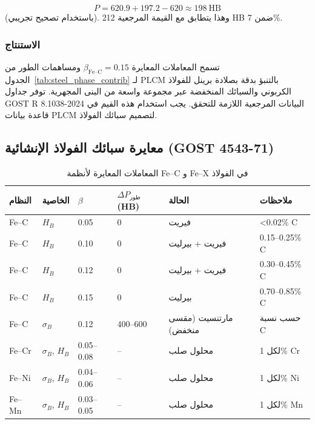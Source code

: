 \documentclass[12pt,a4paper]{article}
\begin{document}
	\[
	P = 620.9 + 197.2 - 620 \approx 198\ \text{HB}
	\]
	(باستخدام تصحيح تجريبي). وهذا يتطابق مع القيمة المرجعية 212 HB ضمن 7\%.
	
	\subsubsection{الاستنتاج}
	
	تسمح المعاملات المعايرة \(\beta_{\text{Fe–C}} = 0.15\) ومساهمات الطور من الجدول~\ref{tab:steel_phase_contrib} لـ PLCM بالتنبؤ بدقة بصلادة برينل للفولاذ الكربوني والسبائك المنخفضة عبر مجموعة واسعة من البنى المجهرية. توفر جداول GOST R 8.1038-2024 البيانات المرجعية اللازمة للتحقق. يجب استخدام هذه القيم في قاعدة بيانات PLCM لتصميم سبائك الفولاذ.
	
	\subsection{معايرة سبائك الفولاذ الإنشائية (GOST 4543-71)}
	\begin{longtable}{p{2.5cm} p{1.2cm} p{1.2cm} p{1.5cm} p{2.0cm} p{2.0cm}}
		\caption{المعاملات المعايرة لأنظمة Fe–C و Fe–X في الفولاذ}\\
		\toprule
		\textbf{النظام} & \textbf{الخاصية} & \(\beta\) & \(\Delta P_{\text{طور}}\) (HB) & \textbf{الحالة} & \textbf{ملاحظات} \\
		\midrule
		Fe–C & \(H_B\) & 0.05 & 0 & فيريت & <0.02\% C \\
		Fe–C & \(H_B\) & 0.10 & 0 & فيريت + بيرليت & 0.15–0.25\% C \\
		Fe–C & \(H_B\) & 0.12 & 0 & فيريت + بيرليت & 0.30–0.45\% C \\
		Fe–C & \(H_B\) & 0.15 & 0 & بيرليت & 0.70–0.85\% C \\
		Fe–C & \(\sigma_B\) & 0.12 & 400–600 & مارتنسيت (مقسى منخفض) & حسب نسبة C \\
		Fe–Cr & \(\sigma_B\), \(H_B\) & 0.05–0.08 & – & محلول صلب & لكل 1\% Cr \\
		Fe–Ni & \(\sigma_B\), \(H_B\) & 0.04–0.06 & – & محلول صلب & لكل 1\% Ni \\
		Fe–Mn & \(\sigma_B\), \(H_B\) & 0.03–0.05 & – & محلول صلب & لكل 1\% Mn \\
		\bottomrule
	\end{longtable}
	
	
\end{document}
